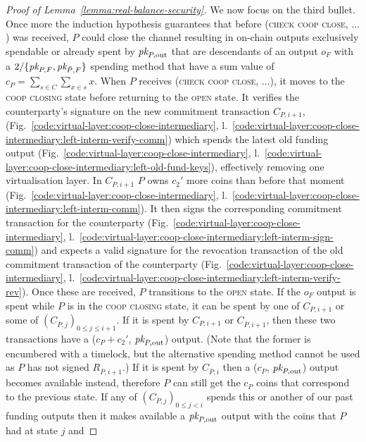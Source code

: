 \begin{proof}[Proof of Lemma~\ref{lemma:real-balance-security}]
  We now focus on the third bullet. Once more the induction hypothesis
  guarantees that before (\textsc{check coop close}, $\dots$) was received, $P$
  could close the channel resulting in on-chain outputs exclusively spendable or
  already spent by $\textit{pk}_{P, \mathrm{out}}$ that are descendants of an output
  $o_F$ with a $2/\{\textit{pk}_{P, F}, \textit{pk}_{\bar{P}, F}\}$ spending method that have a
  sum value of $c_P = \sum\limits_{s \in C} \sum\limits_{x \in s} x$. When $P$
  receives (\textsc{check coop close}, $\dots$), it moves to the \textsc{coop
  closing} state before returning to the \textsc{open} state. It verifies the
  counterparty's signature on the new commitment transaction $C_{P, i+1}$,
  (Fig.~\ref{code:virtual-layer:coop-close-intermediary},
  l.~\ref{code:virtual-layer:coop-close-intermediary:left-interm-verify-comm})
  which spends the latest old funding output
  (Fig.~\ref{code:virtual-layer:coop-close-intermediary},
  l.~\ref{code:virtual-layer:coop-close-intermediary:left-old-fund-keys}),
  effectively removing one virtualisation layer. In $C_{P, i+1}$ $P$ owns $c_2'$
  more coins than before that moment
  (Fig.~\ref{code:virtual-layer:coop-close-intermediary},
  l.~\ref{code:virtual-layer:coop-close-intermediary:left-interm-comm}). It then
  signs the corresponding commitment transaction for the counterparty
  (Fig.~\ref{code:virtual-layer:coop-close-intermediary},
  l.~\ref{code:virtual-layer:coop-close-intermediary:left-interm-sign-comm}) and
  expects a valid signature for the revocation transaction of the old commitment
  transaction of the counterparty
  (Fig.~\ref{code:virtual-layer:coop-close-intermediary},
  l.~\ref{code:virtual-layer:coop-close-intermediary:left-interm-verify-rev}).
  Once these are received, $P$ transitions to the \textsc{open} state. If the
  $o_F$ output is spent while $P$ is in the \textsc{coop closing} state, it can
  be spent by one of $C_{P, i+1}$ or some of $(C_{\bar{P}, j})_{0 \leq j \leq
  i+1}$. If it is spent by $C_{P, i+1}$ or $C_{\bar{P}, i+1}$, then these two
  transactions have a ($c_P + c_2'$, $\textit{pk}_{P, \mathrm{out}}$) output. (Note that
  the former is encumbered with a timelock, but the alternative spending method
  cannot be used as $P$ has not signed $R_{\bar{P}, i+1}$.) If it is spent by
  $C_{\bar{P}, i}$ then a ($c_P$, $\textit{pk}_{P, \mathrm{out}}$) output becomes
  available instead, therefore $P$ can still get the $c_P$ coins that correspond
  to the previous state. If any of $(C_{\bar{P}, j})_{0 \leq j < i}$ spends this
  or another of our past funding outputs then it makes available a $\textit{pk}_{P,
  \mathrm{out}}$ output with the coins that $P$ had at state $j$ and

\end{proof}
